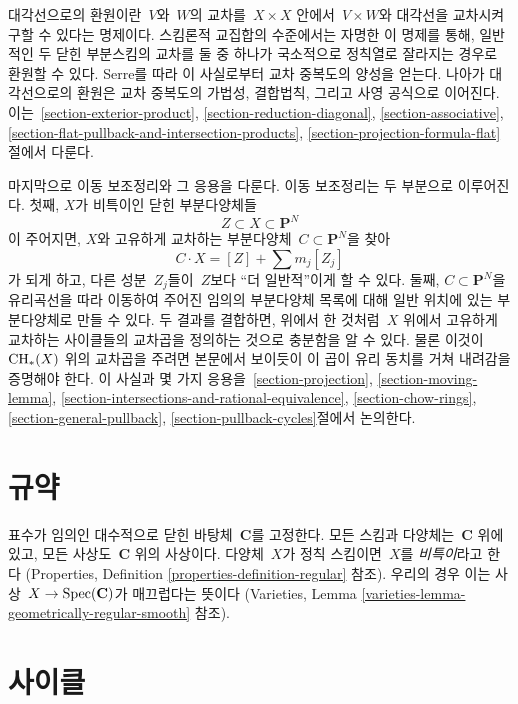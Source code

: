 \medskip\noindent
대각선으로의 환원이란\  $V$와\  $W$의 교차를\  $X \times X$ 안에서\ 
$V \times W$와 대각선을 교차시켜 구할 수 있다는 명제이다. 스킴론적
교집합의 수준에서는 자명한 이 명제를 통해, 일반적인 두 닫힌 부분스킴의
교차를 둘 중 하나가 국소적으로 정칙열로 잘라지는 경우로 환원할 수 있다.
Serre를 따라 이 사실로부터 교차 중복도의 양성을 얻는다. 나아가 대각선으로의
환원은 교차 중복도의 가법성, 결합법칙, 그리고 사영 공식으로 이어진다.
이는\ 
\ref{section-exterior-product},
\ref{section-reduction-diagonal},
\ref{section-associative},
\ref{section-flat-pullback-and-intersection-products},
\ref{section-projection-formula-flat}절에서 다룬다.

\medskip\noindent
마지막으로 이동 보조정리와 그 응용을 다룬다. 이동 보조정리는 두 부분으로
이루어진다. 첫째, $X$가 비특이인 닫힌 부분다양체들
$$
Z \subset X \subset \mathbf{P}^N
$$
이 주어지면, $X$와 고유하게 교차하는 부분다양체\  $C \subset \mathbf{P}^N$을
찾아
$$
C \cdot X = [Z] + \sum m_j [Z_j]
$$
가 되게 하고, 다른 성분\  $Z_j$들이\  $Z$보다 “더 일반적”이게 할 수 있다.
둘째, $C \subset \mathbf{P}^N$을 유리곡선을 따라 이동하여 주어진 임의의
부분다양체 목록에 대해 일반 위치에 있는 부분다양체로 만들 수 있다.
두 결과를 결합하면, 위에서 한 것처럼\  $X$ 위에서 고유하게 교차하는
사이클들의 교차곱을 정의하는 것으로 충분함을 알 수 있다. 물론 이것이\ 
$\mathop{\mathrm{CH}}\nolimits_*(X)$ 위의 교차곱을 주려면 본문에서 보이듯이 이 곱이 유리 동치를
거쳐 내려감을 증명해야 한다. 이 사실과 몇 가지 응용을\ 
\ref{section-projection},
\ref{section-moving-lemma},
\ref{section-intersections-and-rational-equivalence},
\ref{section-chow-rings},
\ref{section-general-pullback},
\ref{section-pullback-cycles}절에서 논의한다.



\section{규약}
\label{section-conventions}

\noindent
표수가 임의인 대수적으로 닫힌 바탕체\  $\mathbf{C}$를 고정한다.
모든 스킴과 다양체는\  $\mathbf{C}$ 위에 있고, 모든 사상도\  $\mathbf{C}$
위의 사상이다. 다양체\  $X$가 정칙 스킴이면\  $X$를 {\it 비특이}라고 한다
(Properties, Definition \ref{properties-definition-regular} 참조).
우리의 경우 이는 사상\  $X \to \mathop{\mathrm{Spec}}(\mathbf{C})$가 매끄럽다는 뜻이다
(Varieties, Lemma \ref{varieties-lemma-geometrically-regular-smooth} 참조).


\section{사이클}
\label{section-cycles}

